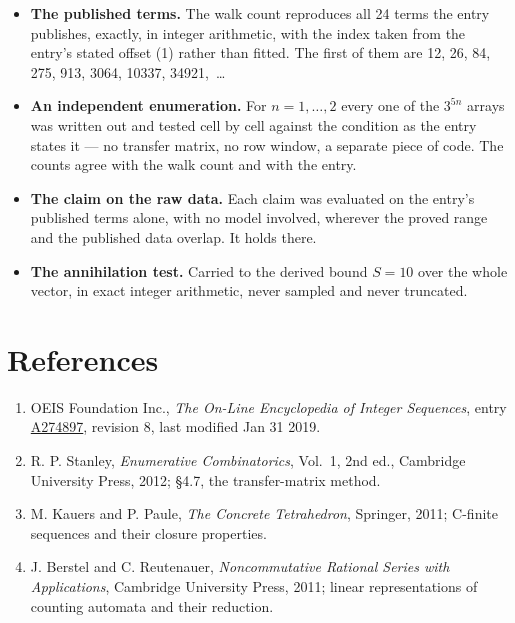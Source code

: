 \documentclass[11pt]{article}
\theoremstyle{definition}
\begin{document}
\begin{itemize}

\item {\bfseries The published terms.} The walk count reproduces all 24 terms the entry publishes, exactly, in integer arithmetic, with the index taken from the entry's stated offset (1) rather than fitted. The first of them are 12, 26, 84, 275, 913, 3064, 10337, 34921,~\dots

\item {\bfseries An independent enumeration.} For $n = 1,\dots,2$ every one of the $3^{5n}$ arrays was written out and tested cell by cell against the condition as the entry states it --- no transfer matrix, no row window, a separate piece of code. The counts agree with the walk count and with the entry.

\item {\bfseries The claim on the raw data.} Each claim was evaluated on the entry's published terms alone, with no model involved, wherever the proved range and the published data overlap. It holds there.

\item {\bfseries The annihilation test.} Carried to the derived bound $S = 10$ over the whole vector, in exact integer arithmetic, never sampled and never truncated.

\end{itemize}

\section{References}

\begin{enumerate}

\item OEIS Foundation Inc., \emph{The On-Line Encyclopedia of Integer Sequences}, entry \href{https://oeis.org/A274897}{A274897}, revision 8, last modified Jan 31 2019.

\item R. P. Stanley, \emph{Enumerative Combinatorics}, Vol.~1, 2nd ed., Cambridge University Press, 2012; \S4.7, the transfer-matrix method.

\item M. Kauers and P. Paule, \emph{The Concrete Tetrahedron}, Springer, 2011; C-finite sequences and their closure properties.

\item J. Berstel and C. Reutenauer, \emph{Noncommutative Rational Series with Applications}, Cambridge University Press, 2011; linear representations of counting automata and their reduction.

\end{enumerate}
\end{document}
